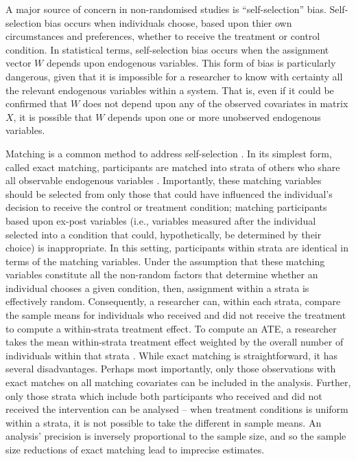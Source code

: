 \documentclass[12pt]{article}
\begin{document}
A major source of concern in non-randomised studies is ``self-selection'' bias. Self-selection bias occurs when individuals choose, based upon thier own circumstances and preferences, whether to receive the treatment or control condition. In statistical terms, self-selection bias occurs when the assignment vector $W$ depends upon endogenous variables. This form of bias is particularly dangerous, given that it is impossible for a researcher to know with certainty all the relevant endogenous variables within a system. That is, even if it could be confirmed that $W$ does not depend upon any of the observed covariates in matrix $X$, it is possible that $W$ depends upon one or more unobserved endogenous variables.

Matching is a common method to address self-selection \citep{stuartMatchingMethodsCausal2010}. In its simplest form, called exact matching, participants are matched into strata of others who share all observable endogenous variables \citep{imaiMisunderstandingsExperimentalistsObservationalists2008}. Importantly, these matching variables should be selected from only those that could have influenced the individual's decision to receive the control or treatment condition; matching participants based upon ex-post variables (i.e., variables measured after the individual selected into a condition that could, hypothetically, be determined by their choice) is inappropriate. In this setting, participants within strata are identical in terms of the matching variables. Under the assumption that these matching variables constitute all the non-random factors that determine whether an individual chooses a given condition, then, assignment within a strata is effectively random. Consequently, a researcher can, within each strata, compare the sample means for individuals who received and did not receive the treatment to compute a within-strata treatment effect. To compute an ATE, a researcher takes the mean within-strata treatment effect weighted by the overall number of individuals within that strata \citep{rosenbaumReducingBiasObservational1984}. While exact matching is straightforward, it has several disadvantages. Perhaps most importantly, only those observations with exact matches on all matching covariates can be included in the analysis. Further, only those strata which include both participants who received and did not received the intervention can be analysed -- when treatment conditions is uniform within a strata, it is not possible to take the different in sample means. An analysis' precision is inversely proportional to the sample size, and so the sample size reductions of exact matching lead to imprecise estimates.
\end{document}
